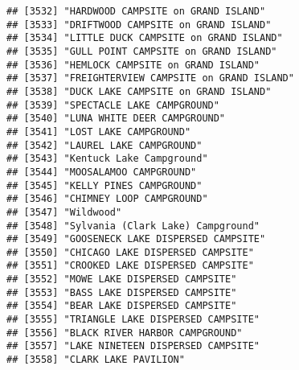 \documentclass[
]{article}
\begin{document}
\begin{verbatim}
## [3532] "HARDWOOD CAMPSITE on GRAND ISLAND"                                                   
## [3533] "DRIFTWOOD CAMPSITE on GRAND ISLAND"                                                  
## [3534] "LITTLE DUCK CAMPSITE on GRAND ISLAND"                                                
## [3535] "GULL POINT CAMPSITE on GRAND ISLAND"                                                 
## [3536] "HEMLOCK CAMPSITE on GRAND ISLAND"                                                    
## [3537] "FREIGHTERVIEW CAMPSITE on GRAND ISLAND"                                              
## [3538] "DUCK LAKE CAMPSITE on GRAND ISLAND"                                                  
## [3539] "SPECTACLE LAKE CAMPGROUND"                                                           
## [3540] "LUNA WHITE DEER CAMPGROUND"                                                          
## [3541] "LOST LAKE CAMPGROUND"                                                                
## [3542] "LAUREL LAKE CAMPGROUND"                                                              
## [3543] "Kentuck Lake Campground"                                                             
## [3544] "MOOSALAMOO CAMPGROUND"                                                               
## [3545] "KELLY PINES CAMPGROUND"                                                              
## [3546] "CHIMNEY LOOP CAMPGROUND"                                                             
## [3547] "Wildwood"                                                                            
## [3548] "Sylvania (Clark Lake) Campground"                                                    
## [3549] "GOOSENECK LAKE DISPERSED CAMPSITE"                                                   
## [3550] "CHICAGO LAKE DISPERSED CAMPSITE"                                                     
## [3551] "CROOKED LAKE DISPERSED CAMPSITE"                                                     
## [3552] "MOWE LAKE DISPERSED CAMPSITE"                                                        
## [3553] "BASS LAKE DISPERSED CAMPSITE"                                                        
## [3554] "BEAR LAKE DISPERSED CAMPSITE"                                                        
## [3555] "TRIANGLE LAKE DISPERSED CAMPSITE"                                                    
## [3556] "BLACK RIVER HARBOR CAMPGROUND"                                                       
## [3557] "LAKE NINETEEN DISPERSED CAMPSITE"                                                    
## [3558] "CLARK LAKE PAVILION"                                                                 

\end{verbatim}
\end{document}
